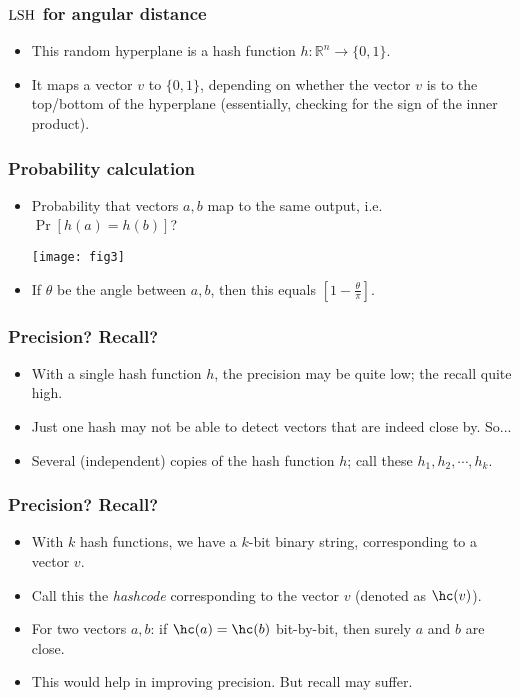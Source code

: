 \documentclass{beamer}
\begin{document}
\begin{frame}
\frametitle{$\mathrm{LSH}$ for angular distance}
\begin{itemize}
\item This random hyperplane is a hash function $h: \mathbb{R}^n \rightarrow \{0, 1\}$. 
\item It maps a vector $v$ to $\{0, 1\}$, depending on whether the vector $v$ is to the top/bottom of the hyperplane (essentially, checking for the sign of the inner product).
\end{itemize}
\end{frame}

\begin{frame}
\frametitle{Probability calculation}
\begin{itemize}
\item Probability that vectors $a, b$ map to the same output, i.e. $\Pr\left[h(a) = h(b)\right]$?
\begin{center}
\texttt{[image: fig3]}
\end{center}
\pause
\item If $\theta$ be the angle between $a, b$, then this equals $\left[1 - \frac{\theta}{\pi}\right]$.
\end{itemize}
\end{frame}

\begin{frame}
\frametitle{Precision? Recall?}
\begin{itemize}
\item With a single hash function $h$, the precision may be quite low; the recall quite high. 
\item Just one hash may not be able to detect vectors that are indeed close by. So...
\pause
\item Several (independent) copies of the hash function $h$; call these $h_1, h_2, \cdots, h_k$.  
\end{itemize}
\end{frame}

\begin{frame}
\frametitle{Precision? Recall?}
\begin{itemize}
\item With $k$ hash functions, we have a $k$-bit binary string, corresponding to a vector $v$.
\item Call this the \textit{hashcode} corresponding to the vector $v$ (denoted as $\hc(v)$). 
\item For two vectors $a, b$: if $\hc(a) = \hc(b)$ bit-by-bit, then surely $a$ and $b$ are close. 
\pause
\item This would help in improving precision. But recall may suffer.
\end{itemize}
\end{frame}
\end{document}
